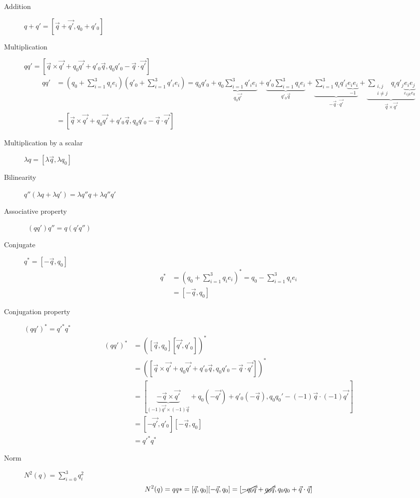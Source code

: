 \documentclass[class=report, float=false, crop=false]{standalone}
\begin{document}
\begin{description}
\item[Addition] $\boxed{q + q' = [\vec{q} + \vec{q'},q_0 + q'_0]}$
\item[Multiplication] $\boxed{qq' = [\vec{q}\times\vec{q'} + q_0\vec{q'} + q'_0\vec{q},q_0q'_0 - \vec{q}\cdot\vec{q'}]}$
\begin{align*}
qq' &= (q_0 + \sum_{i=1}^{3}q_i e_i)(q'_0 + \sum_{i=1}^{3}q'_i e_i) = q_0q'_0 + \underbrace{q_0\sum_{i=1}^{3}q'_i e_i}_{q_0\vec{q'}} + \underbrace{q'_0\sum_{i=1}^{3}q_i e_i}_{q'_0\vec{q}} + \underbrace{\sum_{i=1}^{3}q_iq'_i \underbrace{e_ie_i}_{-1}}_{-\vec{q}\cdot\vec{q'}} + \underbrace{\sum_{\substack{i,j \\ i \neq j}}q_iq'_j\underbrace{e_ie_j}_{\varepsilon_{ijk}e_k}}_{\vec{q}\times\vec{q'}}\\
&= [\vec{q}\times\vec{q'} + q_0\vec{q'} + q'_0\vec{q},q_0q'_0 - \vec{q}\cdot\vec{q'}]
\end{align*}
\item[Multiplication by a scalar] $\boxed{\lambda q = [\lambda\vec{q},\lambda q_0]}$
\item[Bilinearity] $\boxed{q''(\lambda q + \lambda q') = \lambda q''q + \lambda q''q'}$
\item[Associative property] $\boxed{(qq')q'' = q(q'q'')}$
\item[Conjugate] $\boxed{q^* = [-\vec{q},q_0]}$
\begin{align*}
q^* &= (q_0 + \sum_{i=1}^{3}q_i e_i)^* = q_0 - \sum_{i=1}^{3}q_i e_i\\
&= [-\vec{q},q_0]
\end{align*}
\item[Conjugation property] $\boxed{(qq')^* = q'^*q^*}$
\begin{align*}
(qq')^* &= ([\vec{q},q_0][\vec{q'},q'_0])^*\\
&= ([\vec{q}\times\vec{q'} + q_0\vec{q'} + q'_0\vec{q},q_0q'_0 - \vec{q}\cdot\vec{q'}])^*\\
&= [\underbrace{-\vec{q}\times\vec{q'}}_{(-1)\vec{q'}\times(-1)\vec{q}} + q_0(-\vec{q'}) + q'_0(-\vec{q}),q_0q_0' - (-1)\vec{q}\cdot(-1)\vec{q'}]\\
&= [-\vec{q'},q'_0][-\vec{q},q_0]\\
&= q'^*q^*
\end{align*}
\item[Norm] $\boxed{N^2(q) = \sum_{i=0}^{3} q_i^2}$
\begin{align*}
N^2(q) &= qq* = [\vec{q},q_0][-\vec{q},q_0] = [\cancel{-q_0 \vec{q}} + \cancel{q_0\vec{q}},q_0q_0 + \vec{q}\cdot\vec{q}]\\

\end{align*}
\end{description}
\end{document}
